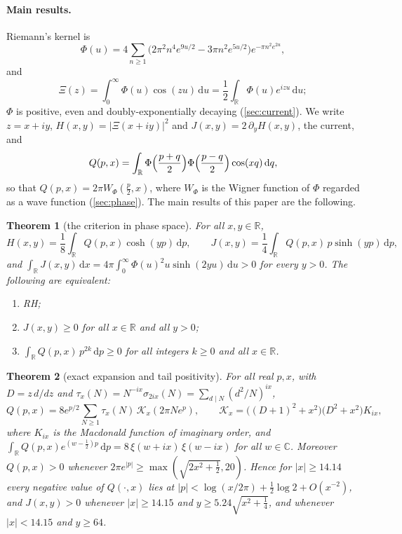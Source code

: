 \documentclass[11pt]{article}
\newtheorem{theorem}{Theorem}[section]
\theoremstyle{definition}\newtheorem{definition}[theorem]{Definition}
\theoremstyle{remark}\newtheorem{remark}[theorem]{Remark}
\newcommand{\R}{\mathbb R}\newcommand{\C}{\mathbb C}\newcommand{\N}{\mathbb N}
\newcommand{\dd}{\,\mathrm d}\newcommand{\e}{\mathrm e}
\begin{document}
\paragraph{Main results.} Riemann's kernel is
\begin{equation}\label{eq:Phi}
\Phi(u)=4\sum_{n\ge1}\bigl(2\pi^2n^4e^{9u/2}-3\pi n^2e^{5u/2}\bigr)e^{-\pi n^2e^{2u}},
\end{equation}
and
\[
\Xi(z)=\int_0^\infty\Phi(u)\cos(zu)\dd u=\frac12\int_\R\Phi(u)e^{izu}\dd u ;
\]
$\Phi$ is positive, even and doubly-exponentially decaying (\cref{sec:current}). We write $z=x+iy$, $H(x,y)=|\Xi(x+iy)|^2$ and $J(x,y)=2\,\partial_yH(x,y)$, the current, and
\[
Q(p,x)=\int_\R\Phi\Bigl(\frac{p+q}2\Bigr)\Phi\Bigl(\frac{p-q}2\Bigr)\cos(xq)\dd q ,
\]
so that $Q(p,x)=2\pi W_\Phi(\frac p2,x)$, where $W_\Phi$ is the Wigner function of $\Phi$ regarded as a wave function (\cref{sec:phase}). The main results of this paper are the following.

\begin{theorem}[the criterion in phase space]\label{mt:criterion}
For all $x,y\in\R$,
\[
H(x,y)=\frac18\int_\R Q(p,x)\cosh(yp)\dd p,\qquad J(x,y)=\frac14\int_\R Q(p,x)\,p\sinh(yp)\dd p ,
\]
and $\int_\R J(x,y)\dd x=4\pi\int_0^\infty\Phi(u)^2u\sinh(2yu)\dd u>0$ for every $y>0$. The following are equivalent:
\begin{enumerate}[label=(\alph*)]
\item RH;
\item $J(x,y)\ge0$ for all $x\in\R$ and all $y>0$;
\item $\int_\R Q(p,x)\,p^{2k}\dd p\ge0$ for all integers $k\ge0$ and all $x\in\R$.
\end{enumerate}
\end{theorem}

\begin{theorem}[exact expansion and tail positivity]\label{mt:tail}
For all real $p,x$, with $D=z\,d/dz$ and $\tau_x(N)=N^{-ix}\sigma_{2ix}(N)=\sum_{d\mid N}(d^2/N)^{ix}$,
\[
Q(p,x)=8e^{p/2}\sum_{N\ge1}\tau_x(N)\,\mathcal K_x(2\pi Ne^p),\qquad \mathcal K_x=\bigl((D+1)^2+x^2\bigr)\bigl(D^2+x^2\bigr)K_{ix},
\]
where $K_{ix}$ is the Macdonald function of imaginary order, and $\int_\R Q(p,x)e^{(w-\frac12)p}\dd p=8\,\xi(w+ix)\,\xi(w-ix)$ for all $w\in\C$. Moreover $Q(p,x)>0$ whenever $2\pi e^{|p|}\ge\max(\sqrt{2x^2+\frac12},20)$. Hence for $|x|\ge14.14$ every negative value of $Q(\cdot,x)$ lies at $|p|<\log(x/2\pi)+\frac12\log2+O(x^{-2})$, and $J(x,y)>0$ whenever $|x|\ge14.15$ and $y\ge5.24\sqrt{x^2+\frac14}$, and whenever $|x|<14.15$ and $y\ge64$.
\end{theorem}
\end{document}
